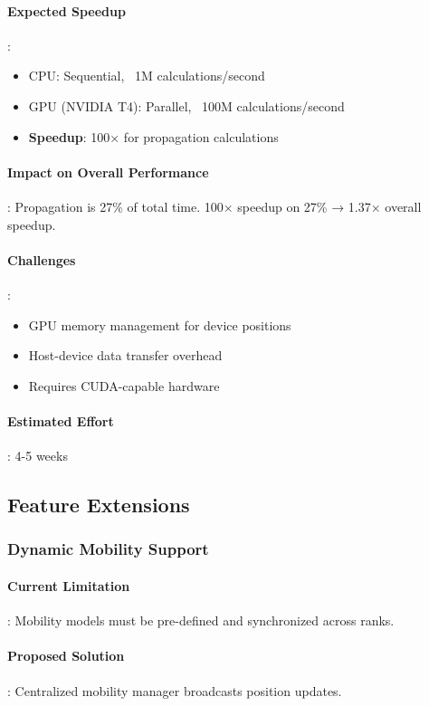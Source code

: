 \paragraph{Expected Speedup}:
\begin{itemize}
    \item CPU: Sequential, ~1M calculations/second
    \item GPU (NVIDIA T4): Parallel, ~100M calculations/second
    \item \textbf{Speedup}: 100× for propagation calculations
\end{itemize}

\paragraph{Impact on Overall Performance}:
Propagation is 27\% of total time. 100× speedup on 27\% → 1.37× overall speedup.

\paragraph{Challenges}:
\begin{itemize}
    \item GPU memory management for device positions
    \item Host-device data transfer overhead
    \item Requires CUDA-capable hardware
\end{itemize}

\paragraph{Estimated Effort}: 4-5 weeks

\subsection{Feature Extensions}

\subsubsection{Dynamic Mobility Support}

\paragraph{Current Limitation}:
Mobility models must be pre-defined and synchronized across ranks.

\paragraph{Proposed Solution}:
Centralized mobility manager broadcasts position updates.

